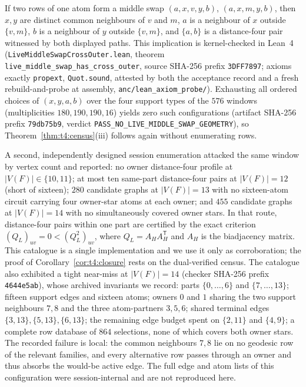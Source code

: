 \begin{proposition}\label{prop:t4:swapgeometry}
If two rows of one atom form a middle swap \((a,x,v,y,b)\),
\((a,x,m,y,b)\), then \(x,y\) are distinct common neighbours of \(v\)
and \(m\), \(a\) is a neighbour of \(x\) outside \(\{v,m\}\), \(b\) is
a neighbour of \(y\) outside \(\{v,m\}\), and \(\{a,b\}\) is a
distance-four pair witnessed by both displayed paths. This implication
is kernel-checked in Lean~4
\textup{(}\texttt{LiveMiddleSwapCrossOuter.lean}, theorem
\texttt{live\_middle\_swap\_has\_cross\_outer}, source SHA-256 prefix
\texttt{3DFF7897}; axioms exactly \texttt{propext},
\texttt{Quot.sound}, attested by both the acceptance record and a
fresh rebuild-and-probe at assembly,
\texttt{anc/lean\_axiom\_probe/}\textup{)}. Exhausting all ordered choices of
\((x,y,a,b)\) over the four support types of the \(576\) windows
\textup{(}multiplicities \(180,190,190,16\)\textup{)} yields zero such
configurations \textup{(}artifact SHA-256 prefix \texttt{79db75b9},
verdict \texttt{PASS\_NO\_LIVE\_MIDDLE\_SWAP\_GEOMETRY}\textup{)}, so
Theorem~\textup{\ref{thm:t4:census}(iii)} follows again without
enumerating rows.
\end{proposition}

\begin{remark}
\label{rem:t4:nearmiss}
A second, independently designed session enumeration attacked the same
window by vertex count and reported: no owner distance-four profile at
\(|V(F)|\in\{10,11\}\); at most ten same-part distance-four pairs at
\(|V(F)|=12\) (short of sixteen); \(280\) candidate graphs at
\(|V(F)|=13\) with no sixteen-atom circuit carrying four owner-star
atoms at each owner; and \(455\) candidate graphs at \(|V(F)|=14\) with
no simultaneously covered owner stars. In that route, distance-four
pairs within one part are certified by the exact criterion
\((Q_L)_{uv}=0<(Q_L^2)_{uv}\), where \(Q_L=A_HA_H^{\mathsf T}\) and
\(A_H\) is the biadjacency matrix. This catalogue is a single
implementation and we use it only as corroboration; the proof of
Corollary~\ref{cor:t4:closure} rests on the dual-verified census. The
catalogue also exhibited a tight near-miss at \(|V(F)|=14\) (checker
SHA-256 prefix \texttt{4644e5ab}), whose archived invariants we record:
parts \(\{0,\dots,6\}\) and \(\{7,\dots,13\}\); fifteen support edges
and sixteen atoms; owners \(0\) and \(1\) sharing the two support
neighbours \(7,8\) and the three atom-partners \(3,5,6\); shared
terminal edges \(\{3,13\},\{5,13\},\{6,13\}\); the remaining edge
budget spent on \(\{2,11\}\) and \(\{4,9\}\); a complete row database
of \(864\) selections, none of which covers both owner stars. The
recorded failure is local: the common neighbours \(7,8\) lie on no
geodesic row of the relevant families, and every alternative row
passes through an owner and thus absorbs the would-be active edge.
The full edge and atom lists of this configuration were
session-internal and are not reproduced here.
\end{remark}

